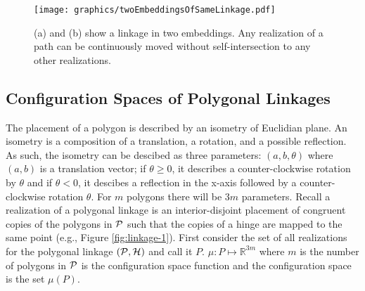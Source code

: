 \documentclass[10pt]{CSUNthesis}
\theoremstyle{plain}%
\theoremstyle{definition}
\theoremstyle{remark}
\newcommand{\HH}{{\cal H}} %
\renewcommand{\PP}{{\cal P}} %
\newcommand{\bbR}{{\mathbb{R}}}
\newcommand{\lr}[1]{\left( #1 \right)}
\begin{document}






\begin{figure}[!htbp]%
\begin{center}
\texttt{[image: graphics/twoEmbeddingsOfSameLinkage.pdf]}
\end{center} 
\caption{(a) and (b) show a linkage in two embeddings.  Any realization of a path can be continuously moved without self-intersection to any other realizations.}
\label{fig:twoEmbeddingsOfSameLinkage.pdf}
\end{figure}

\subsection{Configuration Spaces of Polygonal Linkages}
The placement of a polygon is described by an isometry of Euclidian plane.
An isometry is a composition of a translation, a rotation, and a possible reflection.
As such, the isometry can be descibed as three parameters: $\lr{a,b,\theta}$ where $(a,b)$ is a translation vector; if $\theta \geq 0$, it describes a counter-clockwise rotation by $\theta$ and if $\theta < 0$, it descibes a reflection in the x-axis followed by a counter-clockwise rotation $\theta$.
For $m$ polygons there will be $3 m$ parameters.
Recall a realization of a polygonal linkage is an interior-disjoint placement of congruent copies of the polygons in $\PP$ such that the copies of a hinge are mapped to the same point (e.g., Figure \ref{fig:linkage-1}).
First consider the set of all realizations for the polygonal linkage $\left(\PP,\HH\right)$ and call it $P$.  
$\mu:P \mapsto \bbR^{3m}$ where $m$ is the number of polygons in $\PP$ is the configuration space function and the configuration space is the set $\mu(P)$. 
\end{document}
